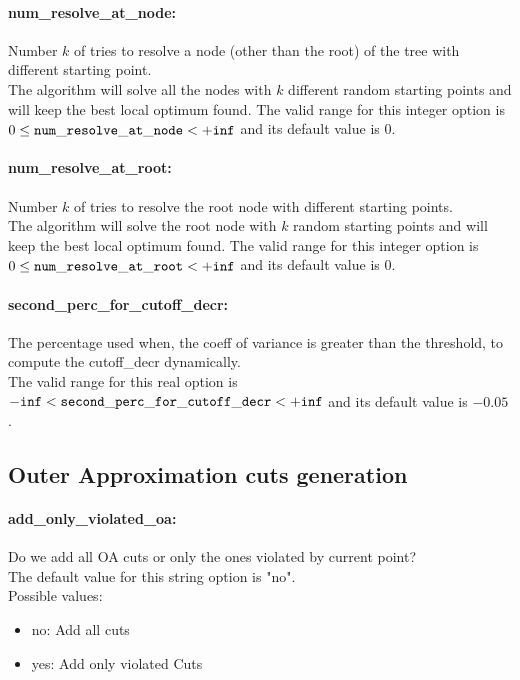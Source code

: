 \paragraph{num\_resolve\_at\_node:}\label{sec:num_resolve_at_node} Number $k$ of tries to resolve a node (other than the root) of the tree with different starting point. $\;$ \\
 The algorithm will solve all the nodes with $k$
different random starting points and will keep
the best local optimum found. The valid range for this integer option is
$0 \le {\tt num\_resolve\_at\_node } <  {\tt +inf}$
and its default value is $0$.


\paragraph{num\_resolve\_at\_root:}\label{sec:num_resolve_at_root} Number $k$ of tries to resolve the root node with different starting points. $\;$ \\
 The algorithm will solve the root node with $k$
random starting points and will keep the best
local optimum found. The valid range for this integer option is
$0 \le {\tt num\_resolve\_at\_root } <  {\tt +inf}$
and its default value is $0$.


\paragraph{second\_perc\_for\_cutoff\_decr:}\label{sec:second_perc_for_cutoff_decr} The percentage used when, the coeff of variance is greater than the threshold, to compute the cutoff\_decr dynamically. $\;$ \\
 The valid range for this real option is 
${\tt -inf} <  {\tt second\_perc\_for\_cutoff\_decr } <  {\tt +inf}$
and its default value is $-0.05$.


\subsection{Outer Approximation cuts generation}
\label{sec:Outer_Approximation_cuts_generation}
\paragraph{add\_only\_violated\_oa:}\label{sec:add_only_violated_oa} Do we add all OA cuts or only the ones violated by current point? $\;$ \\

The default value for this string option is "no".
\\ 
Possible values:
\begin{itemize}
   \item no: Add all cuts
   \item yes: Add only violated Cuts
\end{itemize}

